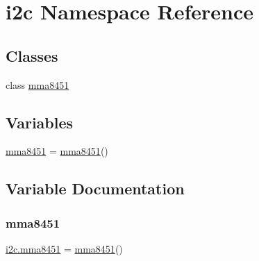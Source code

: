 \hypertarget{namespacei2c}{}\section{i2c Namespace Reference}
\label{namespacei2c}
\subsection*{Classes}
\begin{DoxyCompactItemize}
\item 
class \hyperlink{classi2c_1_1mma8451}{mma8451}
\end{DoxyCompactItemize}
\subsection*{Variables}
\begin{DoxyCompactItemize}
\item 
\hyperlink{namespacei2c_a29172c8d63ecc0516f0dd5b35a226a66}{mma8451} = \hyperlink{classi2c_1_1mma8451}{mma8451}()
\end{DoxyCompactItemize}


\subsection{Variable Documentation}
\mbox{\label{namespacei2c_a29172c8d63ecc0516f0dd5b35a226a66}} 
\subsubsection{\texorpdfstring{mma8451}{mma8451}}
{\footnotesize\ttfamily \hyperlink{classi2c_1_1mma8451}{i2c.\+mma8451} = \hyperlink{classi2c_1_1mma8451}{mma8451}()}

